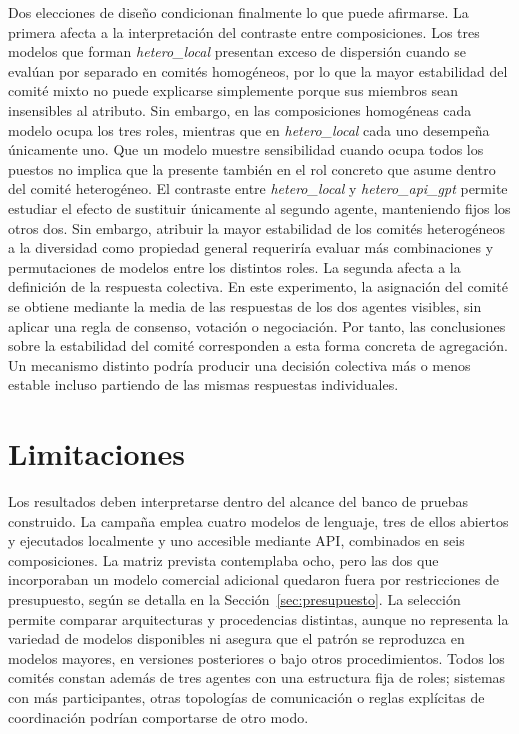 Dos elecciones de diseño condicionan finalmente lo que puede afirmarse. La primera afecta a la interpretación del contraste entre composiciones. Los tres modelos que forman \textit{hetero\_local} presentan exceso de dispersión cuando se evalúan por separado en comités homogéneos, por lo que la mayor estabilidad del comité mixto no puede explicarse simplemente porque sus miembros sean insensibles al atributo. Sin embargo, en las composiciones homogéneas cada modelo ocupa los tres roles, mientras que en \textit{hetero\_local} cada uno desempeña únicamente uno. Que un modelo muestre sensibilidad cuando ocupa todos los puestos no implica que la presente también en el rol concreto que asume dentro del comité heterogéneo. El contraste entre \textit{hetero\_local} y \textit{hetero\_api\_gpt} permite estudiar el efecto de sustituir únicamente al segundo agente,
manteniendo fijos los otros dos. Sin embargo, atribuir la mayor estabilidad de los comités heterogéneos a la diversidad como propiedad general requeriría evaluar más combinaciones y permutaciones de modelos entre los distintos roles. La segunda afecta a la definición de la respuesta colectiva. En este experimento, la asignación del comité se obtiene mediante la media de las respuestas de los dos agentes visibles, sin aplicar una regla de consenso, votación o negociación. Por tanto, las conclusiones sobre la estabilidad del comité corresponden a esta forma concreta de agregación. Un mecanismo distinto podría producir una decisión colectiva más o menos estable incluso partiendo de las mismas respuestas individuales.

\section{Limitaciones}
\label{sec:limitaciones}

Los resultados deben interpretarse dentro del alcance del banco de pruebas construido. La campaña emplea cuatro modelos de lenguaje, tres de ellos abiertos y ejecutados localmente y uno accesible mediante API, combinados en seis composiciones. La matriz prevista contemplaba ocho, pero las dos que incorporaban un modelo comercial adicional quedaron fuera por restricciones de presupuesto, según se detalla en la Sección~\ref{sec:presupuesto}. La selección permite comparar arquitecturas y procedencias distintas, aunque no representa la variedad de modelos disponibles ni asegura que el patrón se reproduzca en modelos mayores, en versiones posteriores o bajo otros procedimientos. Todos los comités constan además de tres agentes con una estructura fija de roles; sistemas con más participantes, otras topologías de comunicación o reglas explícitas de coordinación podrían comportarse de otro modo.

